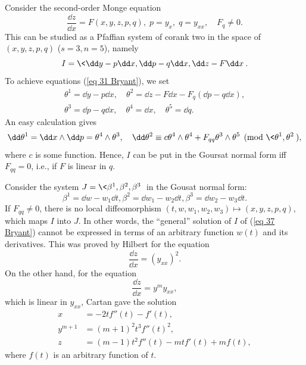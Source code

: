 \begin{example}
    Consider the second-order Monge equation 
    \[\frac{\dd z}{\dd x}=F(x,y,z,p,q),\; p=y_x, \; q=y_{xx},\quad F_q\neq 0.\label{eq 37 Bryant}\]
    This can be studied as a Pfaffian system of corank two in the space of $(x,y,z,p,q)$ ($s=3,n=5$), namely 
    \[I=\<\dd y-p\dd x,\dd p-q\dd x,\dd z-F\dd x\>.\]
    To achieve equations (\ref{eq 31 Bryant}), we set 
    \begin{align}
        \theta^1=\dd y-p\dd x,\quad \theta^2=\dd z-F\dd x-F_q (\dd p- q\dd x),\\
        \theta^3=\dd p-q\dd x,\quad  \theta^4=\dd x,\quad \theta^5=\dd q.
    \end{align}
    An easy calculation gives 
    \[\dd\theta^1=\dd x\wedge\dd p=\theta^4\wedge\theta^3,\quad \dd\theta^2\equiv c\theta^4\wedge\theta^4+F_{qq}\theta^3\wedge\theta^5\pmod{\<\theta^1,\theta^2\>},\]
    where $c$ is some function. Hence, $I$ can be put in the Goursat normal form iff $F_{qq}=0$, i.e., if $F$ is linear in $q$.
    
    Consider the system $J=\<\beta^1,\beta^2,\beta^3\>$ in the Gousat normal form:
    \[\beta^1=\dd w-w_1\dd t,\beta^2=\dd w_1-w_2\dd t, \beta^3=\dd w_2-w_3\dd t.\]
    If $F_{qq}\neq 0$, there is no local diffeomorphism $(t,w,w_1,w_2,w_3)\mapsto (x,y,z,p,q)$, which maps $I$ into $J$. In other words, the ``general'' solution of $I$ of (\ref{eq 37 Bryant}) cannot be expressed in terms of an arbitrary function $w(t)$ and its derivatives. This was proved by Hilbert for the equation 
    \[\frac{\dd z}{\dd x}=(y_{xx})^2.\]
    On the other hand, for the equation 
    \[\frac{\dd z}{\dd x}=y^m y_{xx},\]
    which is linear in $y_{xx}$, Cartan gave the solution 
    \begin{align}
        x&= -2tf''(t)-f'(t),\\
        y^{m+1}&=(m+1)^2 t^3 f''(t)^2,\\
        z&=(m-1)t^2 f''(t)-mtf'(t)+mf(t),
    \end{align}
    where $f(t)$ is an arbitrary function of $t$. 
\end{example}

